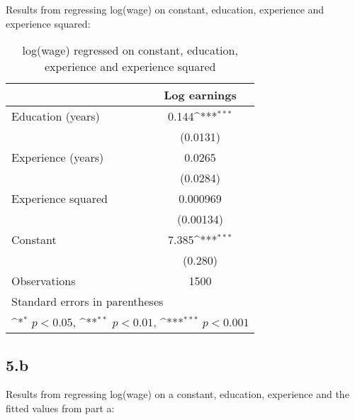 \documentclass{article}
\begin{document}
Results from regressing log(wage) on constant, education, experience and experience squared:

\begin{table}[htbp]\centering
\def\sym#1{\ifmmode^{#1}\else\(^{#1}\)\fi}
\caption{log(wage) regressed on constant, education, experience and experience squared}
\begin{tabular}{l*{1}{c}}
\hline\hline
                    &\multicolumn{1}{c}{Log earnings}\\
\hline
Education (years)   &       0.144\sym{***}\\
                    &    (0.0131)         \\
[1em]
Experience (years)  &      0.0265         \\
                    &    (0.0284)         \\
[1em]
Experience squared  &    0.000969         \\
                    &   (0.00134)         \\
[1em]
Constant            &       7.385\sym{***}\\
                    &     (0.280)         \\
\hline
Observations        &        1500         \\
\hline\hline
\multicolumn{2}{l}{\footnotesize Standard errors in parentheses}\\
\multicolumn{2}{l}{\footnotesize \sym{*} \(p<0.05\), \sym{**} \(p<0.01\), \sym{***} \(p<0.001\)}\\
\end{tabular}
\end{table}

\clearpage
\subsection*{5.b}

Results from regressing log(wage) on a constant, education, experience and the fitted values from part a:
\end{document}
